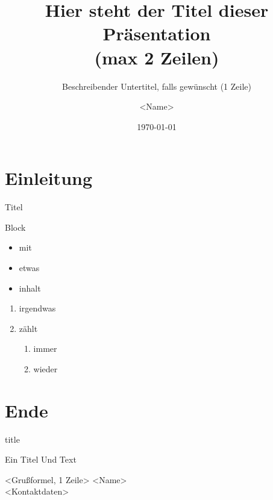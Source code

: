 \usepackage[utf8x]{inputenc}
\usepackage[ngerman]{babel}
\usepackage{amsmath}
\usepackage{tikz}
\usepackage{etex}

\title[kurzer Titel]{Hier steht der Titel dieser Präsentation\\ (max 2 Zeilen)}
\subtitle{Beschreibender Untertitel, falls gewünscht (1 Zeile)}
\author[Kurzname]{\textless{}Name\textgreater}
\date{\today}



\begin{frame}[plain]
  \titlepage
\end{frame}


\section{Einleitung}

\begin{frame}{Titel}
  \begin{block}{Block}
    \begin{itemize}
      \item mit
      \item etwas
      \item inhalt
    \end{itemize}
  \end{block}
\end{frame}


\begin{frame}
\begin{enumerate}
\item irgendwas
\item zählt
  \begin{enumerate}
  \item immer
  \item wieder
  \end{enumerate}
\end{enumerate}
\end{frame}

\section{Ende}

\begin{frame}{title}
\end{frame}

\begin{logoframe}{Ein Titel}
Und Text
\end{logoframe}


\begin{finalframe}{\textless{}Grußformel, 1 Zeile\textgreater}
\textless{}Name\textgreater\\
\textless{}Kontaktdaten\textgreater
\end{finalframe}


